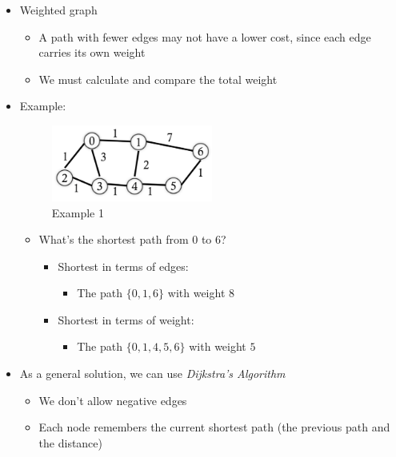 \documentclass[
  10pt,
  english,
  letterpaper,
,tablecaptionabove
]{scrartcl}
\providecommand{\tightlist}{%
  \setlength{\itemsep}{0pt}\setlength{\parskip}{0pt}}
\begin{document}
\begin{itemize}
\item
  Weighted graph

  \begin{itemize}
  \tightlist
  \item
    A path with fewer edges may not have a lower cost, since each edge
    carries its own weight
  \item
    We must calculate and compare the total weight
  \end{itemize}
\item
  Example:

  \begin{figure}
  \centering
  \includegraphics[width=0.5\textwidth,height=\textheight]{images/1.png}
  \caption{Example 1}
  \end{figure}

  \begin{itemize}
  \tightlist
  \item
    What's the shortest path from \(0\) to \(6\)?

    \begin{itemize}
    \tightlist
    \item
      Shortest in terms of edges:

      \begin{itemize}
      \tightlist
      \item
        The path \(\{0, 1, 6\}\) with weight \(8\)
      \end{itemize}
    \item
      Shortest in terms of weight:

      \begin{itemize}
      \tightlist
      \item
        The path \(\{0, 1, 4 ,5, 6\}\) with weight \(5\)
      \end{itemize}
    \end{itemize}
  \end{itemize}
\item
  As a general solution, we can use \emph{Dijkstra's Algorithm}

  \begin{itemize}
  \tightlist
  \item
    We don't allow negative edges
  \item
    Each node remembers the current shortest path (the previous path and
    the distance)


\end{itemize}
\end{itemize}
\end{document}

